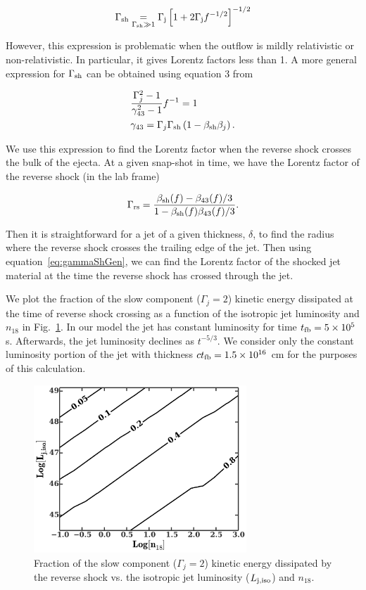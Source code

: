 \documentclass[usenatbib,fleqn]{mnras}
\begin{document}
\begin{equation}
\Gamma_{\rm sh} \underset{\Gamma_{\rm sh} \gg 1}= \Gamma_{\rm j}\left[1 + 2\Gamma_{\rm j}f^{-1/2}\right]^{-1/2}
\end{equation}

However, this expression is problematic when the outflow is mildly
relativistic or non-relativistic. In particular, it gives Lorentz
factors less than 1. A more general expression for $\Gamma_{\rm sh}$
can be obtained using equation 3 from \citet{Beloborodov&Uhm2006}

\begin{align}
&\frac{\Gamma_j^2-1}{\gamma_{43}^2-1} f^{-1}=1\\
&\gamma_{43}=\Gamma_j \Gamma_{\rm sh} \left(1-\beta_{\rm sh} \beta_j\right).
\label{eq:gammaShGen}
\end{align}

We use this expression to find the Lorentz factor when the reverse
shock crosses the bulk of the ejecta.  At a given snap-shot in time,
we have the Lorentz factor of the reverse shock (in the lab frame)

\begin{equation}
\Gamma_{\rm rs}=\frac{\beta_{\rm sh}(f)-\beta_{43}(f)/3}{1-\beta_{\rm
    sh}(f) \beta_{43}(f)/3}.
\end{equation} 

Then it is straightforward for a jet of a given thickness, $\delta$,
to find the radius where the reverse shock crosses the trailing edge
of the jet. Then using equation~\eqref{eq:gammaShGen}, we can find the
Lorentz factor of the shocked jet material at the time the reverse
shock has crossed through the jet.  

We plot the fraction of the slow component ($\Gamma_j=2$) kinetic
energy dissipated at the time of reverse shock crossing as a function
of the isotropic jet luminosity and $n_{18}$ in
Fig.~\ref{fig:diss}. In our model the jet has constant luminosity for
time $t_{\rm fb}=5\times 10^5$ s. Afterwards, the jet luminosity
declines as $t^{-5/3}$. We consider only the constant luminosity
portion of the jet with thickness $c t_{\rm fb}=1.5 \times 10^{16}$ cm
for the purposes of this calculation.

\begin{figure}
\includegraphics[width=8cm]{diss.pdf}
\caption{\label{fig:diss} Fraction of the slow component
  ($\Gamma_j=2$) kinetic energy dissipated by the reverse shock
  vs. the isotropic jet luminosity ($L_{\rm j,iso}$) and $n_{18}$.}
\end{figure}
\end{document}
